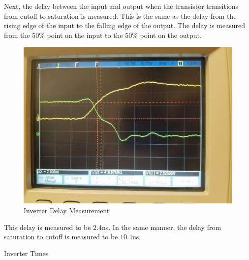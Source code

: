 Next, the delay between the input and output when the transistor transitions from cutoff to saturation is measured. This is the same as the delay from the rising edge of the input to the falling edge of the output. The delay is measured from the $50\%$ point on the input to the $50\%$ point on the output.

\FloatBarrier
\begin{figure}[h!]
	\centering
	\includegraphics[scale=0.25]{../images/inverter_input_rising_td.jpeg}
	\caption{Inverter Delay Measurement}
	\label{fig:inverter_time_delay}
\end{figure}
\FloatBarrier

This delay is measured to be $2.4$\si{\nano\second}. In the same manner, the delay from saturation to cutoff is measured to be $10.4$\si{\nano\second}.

\FloatBarrier
\begin{table}[h!]
	\centering
	\caption{Inverter Times}
	\label{tab:inverter_times}
\end{table}
\FloatBarrier
